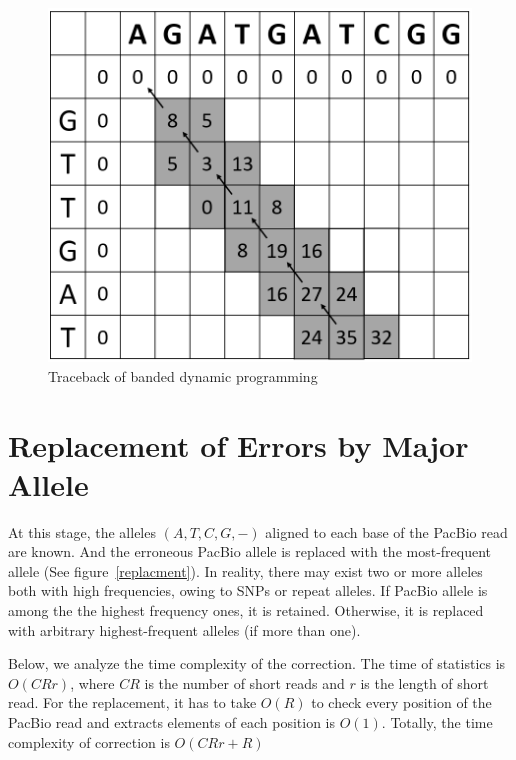 \begin{figure} [h]
\centering
\includegraphics[scale=0.35]{Figures/chapter3/Traceback_DP.png}
\caption{Traceback of banded dynamic programming}
\label{Traceback_DP}
\end{figure}

\newpage

\section{Replacement of Errors by Major Allele}

At this stage, the alleles $(A, T, C, G, -)$ aligned to each base of the PacBio read are known. And the erroneous PacBio allele is replaced with the most-frequent allele (See figure~\ref{replacment}). In reality, there may exist two or more alleles both with high frequencies, owing to SNPs or repeat alleles. If PacBio allele is among the the highest frequency ones, it is retained. Otherwise, it is replaced with arbitrary highest-frequent alleles (if more than one).


Below, we analyze the time complexity of the correction. The time of statistics is $O(CRr)$, where $CR$ is the number of short reads and $r$ is the length of short read. For the replacement, it has to take $O(R)$ to check every position of the PacBio read and extracts elements of each position is $O(1)$. Totally, the time complexity of correction is $O(CRr+R)$

